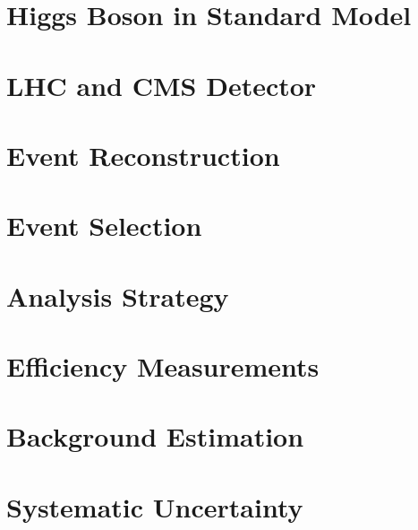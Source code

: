 \documentclass[12pt,chapterheads]{ucsd}
\begin{document}
%






%
\chapter{Higgs Boson in Standard Model}
\label{ch:intro_higgs}
%

%
\chapter{LHC and CMS Detector}
\label{ch:lhc_cms}
%

%
\chapter{Event Reconstruction}
\label{ch:event_reconstruction_selection}


%
\chapter{Event Selection}
\label{ch:event_reconstruction_selection}
%

%
\chapter{Analysis Strategy}
\label{ch:analysis_strategy}
%

%
\chapter{Efficiency Measurements}
\label{ch:efficiency_measurement}
%

%
\chapter{Background Estimation}
\label{ch:background_estimation}
%

%
\chapter{Systematic Uncertainty}
\label{ch:systematics}
%
\end{document}
